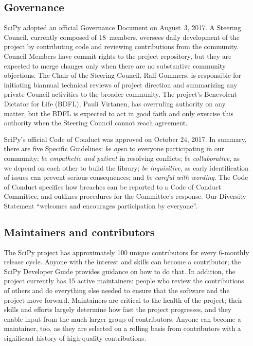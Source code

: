 \documentclass[fleqn,10pt]{wlscirep}
\begin{document}
\subsection*{Governance}

SciPy adopted an official Governance Document on August~3, 2017\cite{SciPyProjectGovernance}. A Steering Council, currently composed of 18~members, oversees daily development of the project by contributing code and reviewing contributions from the community. Council Members have commit rights to the project repository, but they are expected to merge changes only when there are no substantive community objections. The Chair of the Steering Council, Ralf Gommers, is responsible for initiating biannual technical reviews of project direction and summarizing any private Council activities to the broader community. The project's Benevolent Dictator for Life (BDFL), Pauli Virtanen, has overruling authority on any matter, but the BDFL is expected to act in good faith and only exercise this authority when the Steering Council cannot reach agreement.

SciPy's official Code of Conduct was approved on October 24, 2017. In summary, there are five Specific Guidelines:
\emph{be open} to everyone participating in our community;
\emph{be empathetic and patient} in resolving conflicts;
\emph{be collaborative}, as we depend on each other to build the library;
\emph{be inquisitive}, as early identification of issues can prevent serious consequences; and
\emph{be careful with wording}.
The Code of Conduct specifies how breaches can be reported to a Code of Conduct Committee, and outlines procedures for the Committee's response. Our Diversity Statement ``welcomes and encourages participation by everyone''.

\subsection*{Maintainers and contributors}

The SciPy project has approximately 100 unique contributors
for every 6-monthly release cycle. Anyone with the interest and
skills can become a contributor; the SciPy Developer
Guide\cite{scipy-dev-guide} provides guidance on how to do that.
In addition, the project currently has 15 active maintainers: people who review
the contributions of others and do everything else needed to ensure that the
software and the project move forward. Maintainers are critical to the health
of the project\cite{eghbal2016}; their skills and efforts largely determine how
fast the project progresses, and they enable input from the much
larger group of contributors. Anyone can become a maintainer, too, as they
are selected on a rolling basis from contributors with a significant history of
high-quality contributions.
\end{document}
